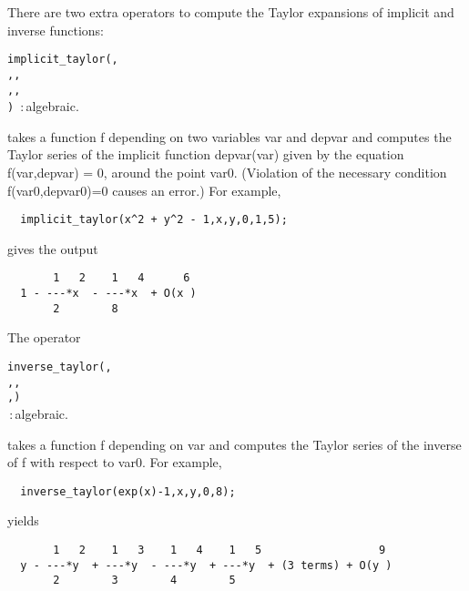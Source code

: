 \hypertarget{operator:IMPLICIT_TAYLOR}{}
There are two
extra operators to compute the Taylor expansions of implicit and
inverse functions:
\begin{syntax}
  \texttt{implicit\_taylor(}\texttt{,}\\
  \hspace*{1.4in}\texttt{,}\texttt{,}\\
  \hspace*{1.4in}\texttt{,}\texttt{,}\\
  \hspace*{1.4in}\texttt{)}
         \,:\,algebraic.
\end{syntax}
takes a function f depending on two variables var and depvar and
computes the Taylor series of the implicit function depvar(var)
given by the equation f(var,depvar) = 0, around the point var0.  
(Violation of the necessary condition f(var0,depvar0)=0 causes an error.)
For example,
\begin{verbatim}
  implicit_taylor(x^2 + y^2 - 1,x,y,0,1,5);
\end{verbatim}
gives the output
\begin{verbatim}
       1   2    1   4      6
  1 - ---*x  - ---*x  + O(x )
       2        8
\end{verbatim}

\hypertarget{operator:INVERSE_TAYLOR}{}
The operator
\begin{syntax}
  \texttt{inverse\_taylor(}\texttt{,}\\
  \hspace*{1.4in}\texttt{,}\texttt{,}\\
  \hspace*{1.4in}\texttt{,}\texttt{)}\\
         \,:\,algebraic.
\end{syntax}
takes a function f depending on var and computes the Taylor series of
the inverse of f with respect to var0. For example,
\begin{verbatim}
  inverse_taylor(exp(x)-1,x,y,0,8);
\end{verbatim}
yields
\begin{verbatim}
       1   2    1   3    1   4    1   5                  9
  y - ---*y  + ---*y  - ---*y  + ---*y  + (3 terms) + O(y )
       2        3        4        5
\end{verbatim}


